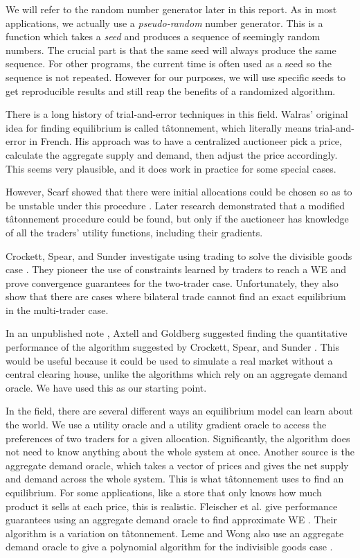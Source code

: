 \documentclass[12pt,a4paper,titlepage]{article}
\begin{document}
We will refer to the random number generator later in this report.
As in most applications, we actually use a \textit{pseudo-random} number generator.
This is a function which takes a \textit{seed} and produces a sequence of seemingly random numbers.
The crucial part is that the same seed will always produce the same sequence.
For other programs, the current time is often used as a seed so the sequence is not repeated.
However for our purposes, we will use specific seeds to get reproducible results and still reap the benefits of a randomized algorithm.

There is a long history of trial-and-error techniques in this field.
Walras' original idea for finding equilibrium is called tâtonnement, which literally means trial-and-error in French.
His approach was to have a centralized auctioneer pick a price, calculate the aggregate supply and demand, then adjust the price accordingly.
This seems very plausible, and it does work in practice for some special cases.

However, Scarf showed that there were initial allocations could be chosen so as to be unstable under this procedure \cite{scarf}.
Later research demonstrated that a modified tâtonnement procedure could be found, but only if the auctioneer has knowledge of all the traders' utility functions, including their gradients.

Crockett, Spear, and Sunder investigate using trading to solve the divisible goods case \cite{crockett}.
They pioneer the use of constraints learned by traders to reach a WE and prove convergence guarantees for the two-trader case.
Unfortunately, they also show that there are cases where bilateral trade cannot find an exact equilibrium in the multi-trader case.

In an unpublished note \cite{goldberg}, Axtell and Goldberg suggested finding the quantitative performance of the algorithm suggested by Crockett, Spear, and Sunder .
This would be useful because it could be used to simulate a real market without a central clearing house, unlike the algorithms which rely on an aggregate demand oracle.
We have used this as our starting point.


In the field, there are several different ways an equilibrium model can learn about the world. 
We use a utility oracle and a utility gradient oracle to access the preferences of two traders for a given allocation.
Significantly, the algorithm does not need to know anything about the whole system at once.
Another source is the aggregate demand oracle, which takes a vector of prices and gives the net supply and demand across the whole system.
This is what tâtonnement uses to find an equilibrium.
For some applications, like a store that only knows how much product it sells at each price, this is realistic.
Fleischer et al. give performance guarantees using an aggregate demand oracle to find approximate WE \cite{fleischer}.
Their algorithm is a variation on tâtonnement.
Leme and Wong also use an aggregate demand oracle to give a polynomial algorithm for the indivisible goods case \cite{leme}.
\end{document}
